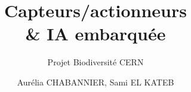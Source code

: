 \title{Capteurs/actionneurs \\ \& IA embarquée}
\subtitle{Projet Biodiversité CERN}
\author{Aurélia CHABANNIER, Sami EL KATEB}
\date{\monthyeardate}

